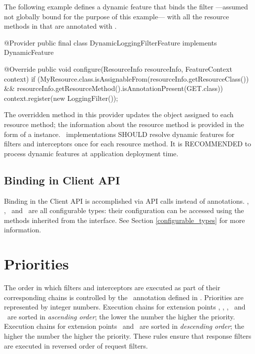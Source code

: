 The following example defines a dynamic feature that binds the filter  ---assumed not globally bound for the purpose of this example--- with all the resource methods in  that are annotated with .

\begin{listing}{1}
@Provider
public final class DynamicLoggingFilterFeature implements DynamicFeature {

  @Override
  public void configure(ResourceInfo resourceInfo,
                        FeatureContext context) {
    if (MyResource.class.isAssignableFrom(resourceInfo.getResourceClass())
      && resourceInfo.getResourceMethod().isAnnotationPresent(GET.class)) {
      context.register(new LoggingFilter());
    }
  }
}
\end{listing}

The overridden method in this provider updates the  object assigned to each resource method; the information about the resource method is provided in the form of a  instance.
\jaxrs\ implementations SHOULD resolve dynamic features for filters and interceptors once for each resource method. It is RECOMMENDED to process dynamic features at application deployment time.

\subsection{Binding in Client API}
\label{binding_in_client_api}

Binding in the Client API is accomplished via API calls instead of annotations. \Client, \Invocation, \InvocationBuilder\ and \WebTarget\ are all configurable types: their configuration can be accessed using the methods inherited from the  interface. See Section \ref{configurable_types} for more information.

\section{Priorities}
\label{priorities}

The order in which filters and interceptors are executed as part of their corresponding chains is controlled by the \Priority\ annotation defined in \cite{jsr250}.
Priorities are represented by integer numbers. Execution chains for extension points \ContainerRequest, \PreMatchContainerRequest, \ClientRequest, \ReadFrom\ and \WriteTo\ are sorted in \emph{ascending order}; the lower the number the higher the priority. Execution chains for extension points \ContainerResponse\ and \ClientResponse\ are sorted in \emph{descending order}; the higher the number the higher the priority. These rules ensure that response filters are executed in reversed order of request filters.


